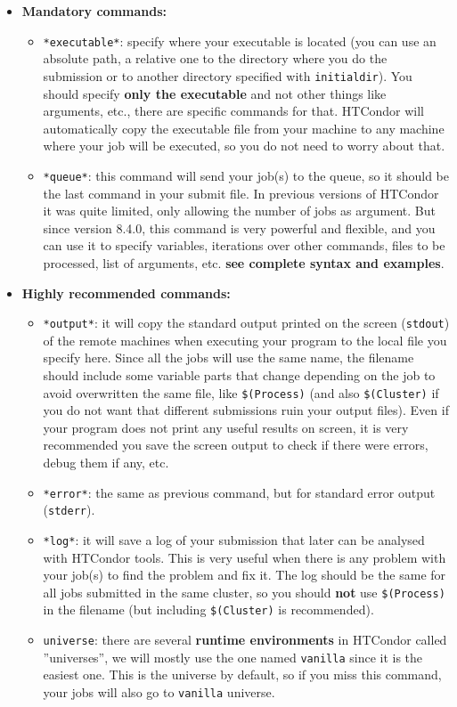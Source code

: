 \documentclass[a4paper,10pt]{article}
\begin{document}
\begin{itemize}
\item \textbf{Mandatory commands:}
\begin{itemize}
\item \texttt{*executable*}: specify where your executable is located (you can use an
absolute path, a relative one to the directory where you do the submission
or to another directory specified with \texttt{initialdir}). You should specify
\textbf{only the executable} and not other things like arguments, etc., there are
specific commands for that. HTCondor will automatically copy the executable
file from your machine to any machine where your job will be executed, so
you do not need to worry about that.
\item \texttt{*queue*}: this command will send your job(s) to the queue, so it should be
the last command in your submit file. In previous versions of HTCondor it
was quite limited, only allowing the number of jobs as argument. But since
version 8.4.0, this command is very powerful and flexible, and you can use
it to specify variables, iterations over other commands, files to be
processed, list of arguments, etc. \textbf{see complete syntax and examples}.
\end{itemize}

\item \textbf{Highly recommended commands:}
\begin{itemize}
\item \texttt{*output*}: it will copy the standard output printed on the screen
(\texttt{stdout}) of the remote machines when executing your program to the local
file you specify here. Since all the jobs will use the same name, the
filename should include some variable parts that change depending on the job
to avoid overwritten the same file, like \texttt{\$(Process)} (and also \texttt{\$(Cluster)}
if you do not want that different submissions ruin your output files). Even
if your program does not print any useful results on screen, it is very
recommended you save the screen output to check if there were errors, debug
them if any, etc.
\item \texttt{*error*}: the same as previous command, but for standard error output
(\texttt{stderr}).
\item \texttt{*log*}: it will save a log of your submission that later can be analysed
with HTCondor tools. This is very useful when there is any problem with your
job(s) to find the problem and fix it.  The log should be the same for all
jobs submitted in the same cluster, so you should \textbf{not} use \texttt{\$(Process)} in
the filename (but including \texttt{\$(Cluster)} is recommended).
\item \texttt{universe}: there are several \textbf{runtime environments} in HTCondor called
''universes'', we will mostly use the one named \texttt{vanilla} since it is the
easiest one. This is the universe by default, so if you miss this command,
your jobs will also go to \texttt{vanilla} universe.
\end{itemize}


\end{itemize}
\end{document}
